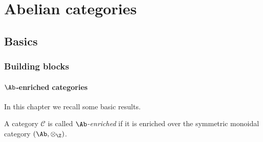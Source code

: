 \documentclass[main.tex]{subfiles}
\begin{document}
\chapter{Abelian categories}
\label{ch:abelian_categories}

\section{Basics}
\label{sec:basics}

\subsection{Building blocks}
\label{ssc:building_blocks}

\subsubsection{\texorpdfstring{$\Ab$}{Ab}-enriched categories}

In this chapter we recall some basic results.

\begin{definition}
  \label{def:ab_enriched_category}
  A category $\mathcal{C}$ is called \emph{$\Ab$-enriched} if it is enriched over the symmetric monoidal category $(\Ab, \otimes_{\Z})$.  
\end{definition}
\end{document}
